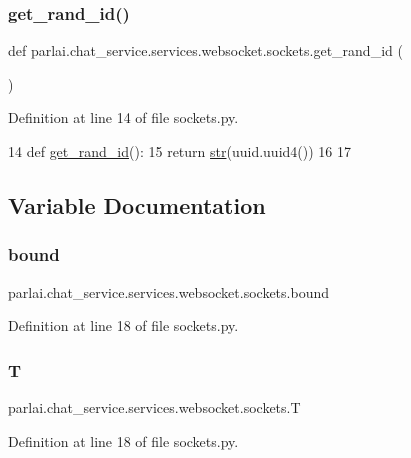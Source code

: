 \subsubsection{\texorpdfstring{get\+\_\+rand\+\_\+id()}{get\_rand\_id()}}
{\footnotesize\ttfamily def parlai.\+chat\+\_\+service.\+services.\+websocket.\+sockets.\+get\+\_\+rand\+\_\+id (\begin{DoxyParamCaption}{ }\end{DoxyParamCaption})}



Definition at line 14 of file sockets.\+py.


\begin{DoxyCode}
14 \textcolor{keyword}{def }\hyperlink{namespaceparlai_1_1chat__service_1_1services_1_1websocket_1_1sockets_a474be2aef9361e19eacf308fbce1e802}{get\_rand\_id}():
15     \textcolor{keywordflow}{return} \hyperlink{namespacegenerate__task__READMEs_a5b88452ffb87b78c8c85ececebafc09f}{str}(uuid.uuid4())
16 
17 
\end{DoxyCode}


\subsection{Variable Documentation}
\mbox{\label{namespaceparlai_1_1chat__service_1_1services_1_1websocket_1_1sockets_ad329c1d9832400cb79ca995c091d6ced}} 
\subsubsection{\texorpdfstring{bound}{bound}}
{\footnotesize\ttfamily parlai.\+chat\+\_\+service.\+services.\+websocket.\+sockets.\+bound}



Definition at line 18 of file sockets.\+py.

\mbox{\label{namespaceparlai_1_1chat__service_1_1services_1_1websocket_1_1sockets_a263c27434f199b969889951a87aa7fc6}} 
\subsubsection{\texorpdfstring{T}{T}}
{\footnotesize\ttfamily parlai.\+chat\+\_\+service.\+services.\+websocket.\+sockets.\+T}



Definition at line 18 of file sockets.\+py.

